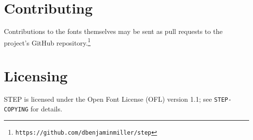 \documentclass[12pt]{article}
\begin{document}
\section{Contributing}
Contributions to the fonts themselves may be sent as pull requests to the project's GitHub repository.\footnote{\texttt{https://github.com/dbenjaminmiller/step}}
\section{Licensing}
STEP is licensed under the Open Font License (OFL) version 1.1; see \texttt{STEP-COPYING} for details.
\end{document}
